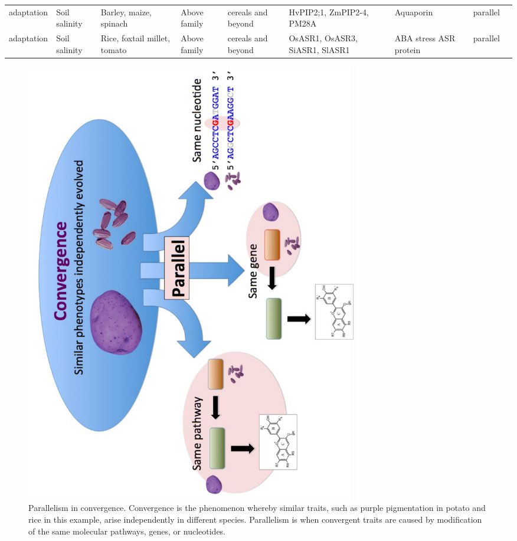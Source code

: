 \documentclass[12pt]{article}
\begin{document}
\begin{table}
\begin{center}
\begin{tabular}{C{1.5cm}G{2.5cm}C{3.10cm}C{3.2cm}C{2.3cm}G{3.5cm}G{2.1cm}C{1.3cm}G{1.5cm}}
 adaptation & Soil salinity &Barley, maize, spinach & Above family & cereals and beyond & HvPIP2;1, ZmPIP2-4, PM28A & Aquaporin & parallel & \citep{Katsuhara2002, Zhu2005, Fotiadis2000}\\
 adaptation & Soil salinity &Rice, foxtail millet, tomato & Above family & cereals and beyond & OsASR1, OsASR3, SiASR1, SlASR1 & ABA stress ASR protein & parallel & \citep{Li2017, Konrad2008}\\
\end{tabular}
\end{center}
\end{table}

\begin{figure}[h]
    \centering
    \includegraphics[width=15cm]{convergence_fig.pdf}
    \caption{Parallelism in convergence. Convergence is the phenomenon whereby similar traits, such as purple pigmentation in potato and rice in this example, arise independently in different species. Parallelism is when convergent traits are caused by modification of the same molecular pathways, genes, or nucleotides.
}
    \label{fig:convergence}
\end{figure}
\end{document}
